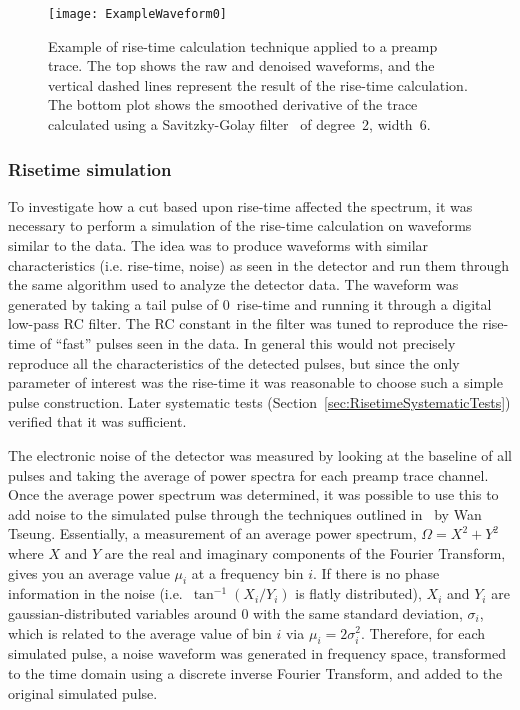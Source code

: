 				\begin{figure}
					\centering
					\texttt{[image: ExampleWaveform0]}
					\caption[Example of rise-time calculation technique applied to a preamp trace]
					{Example of rise-time calculation technique applied to a preamp trace.  
					The top shows the raw and denoised waveforms, and the vertical dashed lines represent the result 
					of the rise-time calculation.  The bottom plot shows the smoothed derivative of the trace calculated 
					using a Savitzky-Golay filter~\cite{Sav64aa} of degree~2, width~6.}
					\label{fig:RisetimeCutsExampleOfPulse}
				\end{figure}					

			\subsubsection{Risetime simulation}
			\label{sec:RisetimeSimulation}
	
	To investigate how a cut based upon rise-time affected the spectrum, it was necessary to perform a simulation of the rise-time calculation on waveforms similar to the data.  The idea was to produce waveforms with similar characteristics (i.e. rise-time, noise) as seen in the detector and run them through the same algorithm used to analyze the detector data.  The waveform was generated by taking a tail pulse of 0~rise-time and running it through a digital low-pass RC filter.  The RC constant in the filter was tuned to reproduce the rise-time of ``fast'' pulses seen in the data.  In general this would not precisely reproduce all the characteristics of the detected pulses, but since the only parameter of interest was the rise-time it was reasonable to choose such a simple pulse construction.  Later systematic tests (Section~\ref{sec:RisetimeSystematicTests}) verified that it was sufficient.  
	
	The electronic noise of the detector was measured by looking at the baseline of all pulses and taking the average of power spectra for each preamp trace channel.  Once the average power spectrum was determined, it was possible to use this to add noise to the simulated pulse through the techniques outlined in~\cite{WanThesis08} by Wan Tseung.  Essentially, a measurement of an average power spectrum, $\Omega = X^{2} + Y^{2}$ where $X$ and $Y$ are the real and imaginary components of the Fourier Transform, gives you an average value $\mu_{i}$ at a frequency bin $i$.  If there is no phase information in the noise (i.e.~$\tan^{-1} (X_{i}/Y_{i})$ is flatly distributed), $X_{i}$ and $Y_{i}$ are gaussian-distributed variables around 0 with the same standard deviation, $\sigma_{i}$, which is related to the average value of bin $i$ via  $\mu_{i} = 2 \sigma_{i}^{2}$.  Therefore, for each simulated pulse, a noise waveform was generated in frequency space, transformed to the time domain using a discrete inverse Fourier Transform, and added to the original simulated pulse.  
	
